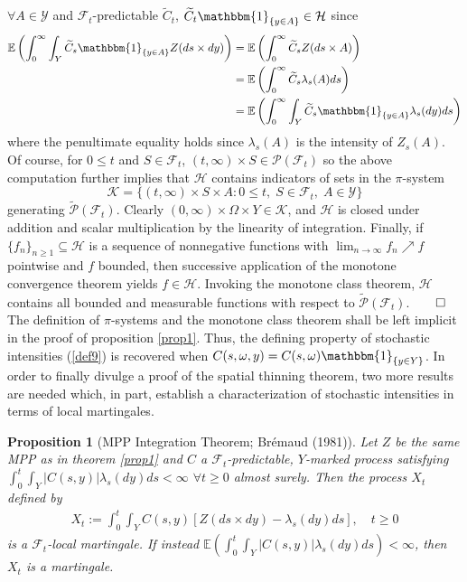 \documentclass[12pt, oneside]{report}
\newcommand{\E}{\mathbb{E}}
\newcommand{\1}[1]{\mathbbm{1}_{\{#1\}}}
\newcommand{\mc}[1]{\mathcal{#1}}
\newtheorem{proposition}[theorem]{Proposition}
\theoremstyle{definition}
\begin{document}
$\forall A\in\mc{Y}$ and $\mc{F}_t$-predictable $\widetilde{C}_t$,
$\widetilde{C}_t\1{y\in A}\in\mc{H}$ since
\begin{align*}
    \E\left(\int_0^\infty\int_Y\widetilde{C}_s\1{y\in A}Z(ds\times dy)\right)&=\E\left(\int_0^\infty \widetilde{C}_sZ(ds\times A)\right)\\
    &=\E\left(\int_0^\infty\widetilde{C}_s\lambda_s(A)ds\right)\\
    &=\E\left(\int_0^\infty\int_Y\widetilde{C}_s\1{y\in A}\lambda_s(dy)ds\right)
\end{align*}
where the penultimate equality holds since $\lambda_s(A)$ is the intensity of
$Z_s(A)$. Of course, for $0\leq t$ and $S\in\mc{F}_t$, $(t,\infty)\times
S\in\mc{P}(\mc{F}_t)$ so the above computation further implies that $\mc{H}$
contains indicators of sets in the $\pi$-system
\[\mc{K}=\{(t,\infty)\times S\times A:0\leq t,\;S\in\mc{F}_t,\;A\in\mc{Y}\}\]
generating $\widetilde{\mc{P}}(\mc{F}_t)$. Clearly $(0,\infty)\times\Omega\times
Y\in\mc{K}$, and $\mc{H}$ is closed under addition and scalar multiplication by
the linearity of integration. Finally, if $\{f_n\}_{n\geq 1}\subseteq\mc{H}$ is
a sequence of nonnegative functions with $\lim_{n\rightarrow\infty}f_n\nearrow
f$ pointwise and $f$ bounded, then successive application of the monotone
convergence theorem yields $f\in\mc{H}$. Invoking the monotone class theorem,
$\mc{H}$ contains all bounded and measurable functions with respect to
$\widetilde{\mc{P}}(\mc{F}_t)$.\hfill{$\qed$}\\[5pt]
\indent The definition of $\pi$-systems and the monotone class theorem shall be
left implicit in the proof of proposition \ref{prop1}. Thus, the defining
property of stochastic intensities (\ref{def9}) is recovered when
$C(s,\omega,y)=C(s,\omega)\1{y\in Y}$. In order to finally divulge a proof of
the spatial thinning theorem, two more results are needed which, in part, establish a
characterization of stochastic intensities in terms of local martingales.
\begin{proposition}[MPP Integration Theorem; Br\'emaud (1981)]\label{prop2} Let
    $Z$ be the same MPP as in theorem \ref{prop1} and $C$ a
    $\mc{F}_t$-predictable, $Y$-marked process satisfying
    $\int_0^t\int_Y|C(s,y)|\lambda_s(dy)ds<\infty$ $\forall t\geq 0$ almost
    surely. Then the process $X_t$ defined by
    \begin{align*}
        X_t:=\int_0^t\int_Y C(s,y)\left[Z(ds\times dy)-\lambda_s(dy)ds\right],\quad t\geq 0
    \end{align*}
    is a $\mc{F}_t$-local martingale. If instead $\E\left(\int_0^t\int_Y|C(s,y)|\lambda_s(dy)ds\right)<\infty$, then $X_t$ is a
    martingale.
\end{proposition}
\end{document}
